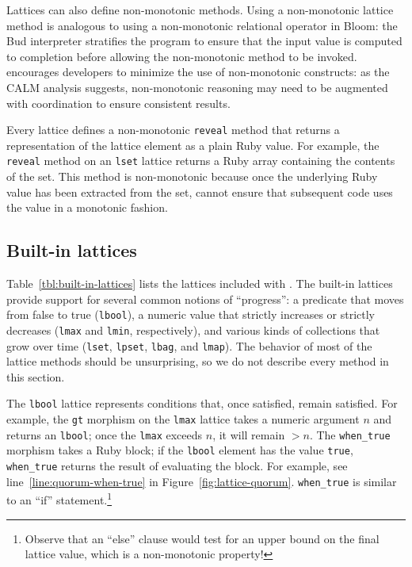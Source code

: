 Lattices can also define non-monotonic methods. Using a non-monotonic lattice
method is analogous to using a non-monotonic relational operator in Bloom: the
Bud interpreter stratifies the program to ensure that the input value is
computed to completion before allowing the non-monotonic method to be
invoked. \lang encourages developers to minimize the use of non-monotonic
constructs: as the CALM analysis suggests, non-monotonic reasoning may need to
be augmented with coordination to ensure consistent results.

Every lattice defines a non-monotonic \texttt{reveal} method that returns a
representation of the lattice element as a plain Ruby value. For example, the
\texttt{reveal} method on an \texttt{lset} lattice returns a Ruby array
containing the contents of the set. This method is non-monotonic because once the
underlying Ruby value has been extracted from the set, \lang cannot ensure that
subsequent code uses the value in a monotonic fashion.

\subsection{Built-in lattices}
\label{sec:lattice-built-ins}

Table~\ref{tbl:built-in-lattices} lists the lattices included with \lang. The
built-in lattices provide support for several common notions of ``progress'': a
predicate that moves from false to true (\texttt{lbool}), a numeric value that
strictly increases or strictly decreases (\texttt{lmax} and \texttt{lmin},
respectively), and various kinds of collections that grow over time
(\texttt{lset}, \texttt{lpset}, \texttt{lbag}, and \texttt{lmap}). The behavior
of most of the lattice methods should be unsurprising, so we do not describe
every method in this section.

The \texttt{lbool} lattice represents conditions that, once satisfied, remain
satisfied. For example, the \texttt{gt} morphism on the \texttt{lmax} lattice
takes a numeric argument $n$ and returns an \texttt{lbool}; once the
\texttt{lmax} exceeds $n$, it will remain $>n$. The \texttt{when\_true} morphism
takes a Ruby block; if the \texttt{lbool} element has the value \texttt{true},
\texttt{when\_true} returns the result of evaluating the block. For example, see
line~\ref{line:quorum-when-true} in
Figure~\ref{fig:lattice-quorum}. \texttt{when\_true} is similar to an ``if''
statement.\footnote{Observe that an ``else'' clause would test for an upper
  bound on the final lattice value, which is a non-monotonic property!}

